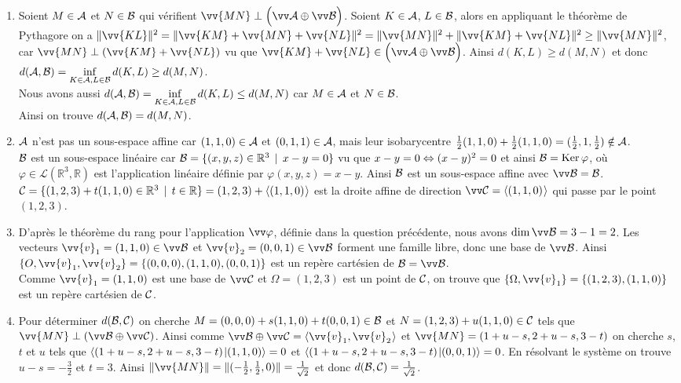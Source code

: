 \documentclass[a4paper,12pt,reqno]{amsart}
\begin{document}
\begin{solution}
  \begin{enumerate}
    \item Soient $M\in\mathcal{A}$ et $N\in\mathcal{B}$ qui vérifient $\vv{MN} \perp \Big(\ev{A} \oplus \ev{B}\Big)$. Soient $K \in \mathcal{A}$, $L \in \mathcal{B}$, alors  en appliquant le théorème de Pythagore on a $\| \vv{KL} \|^{2} = \| \vv{KM} + \vv{MN} + \vv{NL} \|^{2} = \|\vv{MN}\|^{2} + \| \vv{KM} + \vv{NL} \|^{2} \geq \|\vv{MN}\|^{2}$, car $\vv{MN} \perp (\vv{KM} + \vv{NL})$ vu que $\vv{KM} + \vv{NL} \in \Big(\ev{A} \oplus \ev{B}\Big)$. Ainsi $d(K,L) \geq d(M,N)$ et donc $d(\mathcal{A}, \mathcal{B}) = \displaystyle\inf_{K \in \mathcal{A}, L \in \mathcal{B}} d(K,L) \geq d(M,N)$.\\
    Nous avons aussi $d(\mathcal{A}, \mathcal{B}) = \displaystyle\inf_{K \in \mathcal{A}, L \in \mathcal{B}} d(K,L) \leq d(M,N)$ car $M\in\mathcal{A}$ et $N\in\mathcal{B}$.\\
    Ainsi on trouve $d(\mathcal{A}, \mathcal{B}) =  d(M,N)$.
    \item $\mathcal{A}$ n'est pas un sous-espace affine car $(1,1,0) \in \mathcal{A}$ et $(0,1,1) \in \mathcal{A}$, mais leur isobarycentre $\frac{1}{2}(1,1,0) + \frac{1}{2}(1,1,0) = (\frac{1}{2},1,\frac{1}{2}) \notin \mathcal{A}$.\\
    $\mathcal{B}$ est un sous-espace linéaire car $\mathcal{B} = \{ (x,y,z) \in \mathbb{R}^{3} \,\mid\, x-y = 0 \}$ vu que $x-y = 0 \Leftrightarrow (x-y)^{2} = 0$ et ainsi $\mathcal{B} = \operatorname{Ker} \varphi$, où $\varphi \in \mathcal{L}(\mathbb{R}^{3},\mathbb{R})$ est l'application linéaire définie par $\varphi(x,y,z)=x-y$. Ainsi $\mathcal{B}$ est un sous-espace affine avec $\ev{B} = \ens{B}$.\\
    $\mathcal{C} = \{ (1,2,3)+t(1,1,0) \in \mathbb{R}^{3} \,\mid\, t \in \mathbb{R} \} = (1,2,3)+ \langle{(1,1,0)}\kern.07em\rangle$ est la droite affine de direction $\ev{C}=\affspan{(1,1,0)}$ qui passe par le point $(1,2,3)$.
    \item D'après le théorème du rang pour l'application $\vv\varphi$, définie dans la question précédente, nous avons $\dim \ev{B} = 3-1=2$. Les vecteurs $\vv{v}_{1} = (1,1,0) \in \ev{B}$ et $\vv{v}_{2} = (0,0,1) \in \ev{B}$ forment une famille libre, donc une base de $\ev{B}$. Ainsi $\{O, \vv{v}_{1}, \vv{v}_{2}\} = \{(0,0,0), (1,1,0), (0,0,1)\}$ est un repère cartésien de $\ens{B} = \ev{B}$.\\
    Comme $\vv{v}_{1} = (1,1,0)$ est une base de $\ev{C}$ et $\Omega = (1,2,3)$ est un point de $\mathcal{C}$, on trouve que $\{\Omega,\vv{v}_{1}\} = \{(1,2,3),(1,1,0)\}$ est un repère cartésien de $\mathcal{C}$.
    \item Pour déterminer $d(\mathcal{B},\mathcal{C})$ on cherche $M=(0,0,0)+s(1,1,0)+t(0,0,1) \in \mathcal{B}$ et $N=(1,2,3)+u(1,1,0) \in \mathcal{C}$ tels que $\vv{MN}\perp(\ev{B}\oplus\ev{C})$. Ainsi comme $\ev{B}\oplus\ev{C} = \affspan{\vv{v}_{1},\vv{v}_{2}}$ et $\vv{MN} = (1+u-s,2+u-s,3-t)$ on cherche $s$,$t$ et $u$ tels que $\langle{(1+u-s,2+u-s,3-t)}\kern1pt |{(1,1,0)}\rangle=0$ et $\langle{(1+u-s,2+u-s,3-t)}\kern1pt |{(0,0,1)}\rangle=0$. En résolvant le système on trouve $u-s = -\frac{3}{2}$ et $t=3$. Ainsi $\| \vv{MN} \|  = \| (-\frac{1}{2},\frac{1}{2},0) \| = \frac{1}{\sqrt{2}}$ et donc $d(\mathcal{B},\mathcal{C}) = \frac{1}{\sqrt{2}}$.
  \end{enumerate}


\end{solution}
\end{document}
